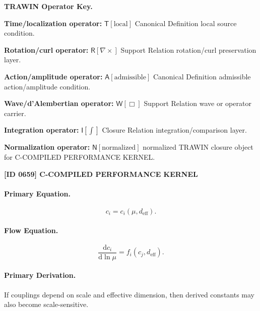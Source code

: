 \par\vspace{0.45\baselineskip}
\noindent\begin{minipage}[t]{\linewidth}
\begingroup
\small
\raggedright
\textbf{TRAWIN Operator Key.}\par
\noindent\textbf{Time/localization operator:} $\mathsf{T}\!\left[\mathrm{local}\right]$ Canonical Definition local source condition.\par
\noindent\textbf{Rotation/curl operator:} $\mathsf{R}\!\left[\nabla\times\right]$ Support Relation rotation/curl preservation layer.\par
\noindent\textbf{Action/amplitude operator:} $\mathsf{A}\!\left[\mathrm{admissible}\right]$ Canonical Definition admissible action/amplitude condition.\par
\noindent\textbf{Wave/d'Alembertian operator:} $\mathsf{W}\!\left[\Box\right]$ Support Relation wave or operator carrier.\par
\noindent\textbf{Integration operator:} $\mathsf{I}\!\left[\int\right]$ Closure Relation integration/comparison layer.\par
\noindent\textbf{Normalization operator:} $\mathsf{N}\!\left[\mathrm{normalized}\right]$ normalized TRAWIN closure object for C-COMPILED PERFORMANCE KERNEL.\par
\endgroup
\end{minipage}

\clearpage
\noindent\textbf{[ID 0659] C-COMPILED PERFORMANCE KERNEL}\par
\vspace{0.35em}
\paragraph{Primary Equation.}
\begin{equation}
c_i=c_i(\mu,d_{\mathrm{eff}}).
\end{equation}

\paragraph{Flow Equation.}
\begin{equation}
\frac{\mathrm{d}c_i}{\mathrm{d}\ln\mu}
=
f_i(c_j,d_{\mathrm{eff}}).
\end{equation}

\paragraph{Primary Derivation.}
If couplings depend on scale and effective dimension, then derived constants may also become scale-sensitive.

